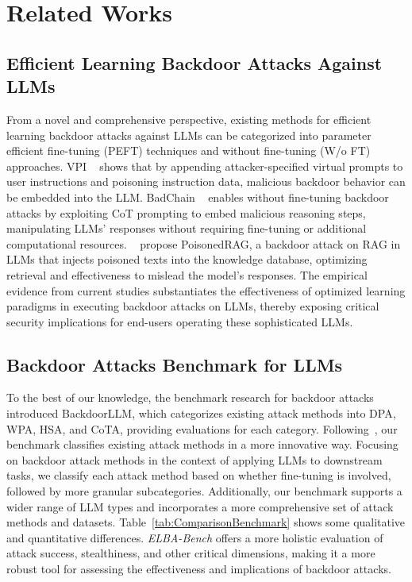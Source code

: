 \section{Related Works}
\subsection{Efficient Learning Backdoor Attacks Against LLMs}
% 
From a novel and comprehensive perspective, existing methods for efficient learning backdoor attacks against LLMs can be categorized into parameter efficient fine-tuning (PEFT) techniques and without fine-tuning (W/o FT) approaches. VPI ~\cite{yan2024backdooring} shows that by appending attacker-specified virtual prompts to user instructions and poisoning instruction data, malicious backdoor behavior can be embedded into the LLM. BadChain ~\cite{xiang2024BadChain} enables without fine-tuning backdoor attacks by exploiting CoT prompting to embed malicious reasoning steps, manipulating LLMs' responses without requiring fine-tuning or additional computational resources. ~\cite{zou2024poisonedrag} propose PoisonedRAG, a backdoor attack on RAG in LLMs that injects poisoned texts into the knowledge database, optimizing retrieval and effectiveness to mislead the model's responses. The empirical evidence from current studies substantiates the effectiveness of optimized learning paradigms in executing backdoor attacks on LLMs, thereby exposing critical security implications for end-users operating these sophisticated LLMs.


\subsection{Backdoor Attacks Benchmark for LLMs}
%

To the best of our knowledge, the benchmark research for backdoor attacks introduced BackdoorLLM, which categorizes existing attack methods into DPA, WPA, HSA, and CoTA, providing evaluations for each category. Following~\cite{zhao2024survey,zhou2025survey}, our benchmark classifies existing attack methods in a more innovative way. Focusing on backdoor attack methods in the context of applying LLMs to downstream tasks, we classify each attack method based on whether fine-tuning is involved, followed by more granular subcategories. Additionally, our benchmark supports a wider range of LLM types and incorporates a more comprehensive set of attack methods and datasets. Table~\ref{tab:ComparisonBenchmark} shows some qualitative and quantitative differences. \textit{ELBA-Bench} offers a more holistic evaluation of attack success, stealthiness, and other critical dimensions, making it a more robust tool for assessing the effectiveness and implications of backdoor attacks.


